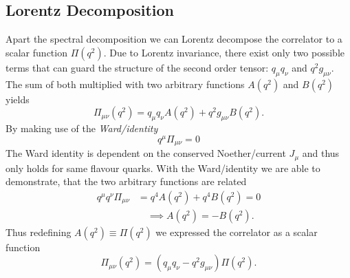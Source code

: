\documentclass[../../index.tex]{subfiles}
\begin{document}
\subsection{Lorentz Decomposition}
Apart the spectral decomposition we can Lorentz decompose the correlator to a
scalar function $\Pi(q^2)$. Due to Lorentz invariance, there exist only two
possible terms that can guard the structure of the second order tensor: $q_\mu
q_\nu$ and $q^2 g_{\mu\nu}$. The sum of both multiplied with two arbitrary
functions $A(q^2)$ and $B(q^2)$ yields
\begin{equation}
  \Pi_{\mu\nu}(q^2) = q_\mu q_\nu A(q^2) + q^2 g_{\mu\nu} B(q^2).
\end{equation}
By making use of the \textit{Ward\-/identity}
\begin{equation}
  \label{eq:wardIdentity}
  q^\mu \Pi_{\mu\nu} = 0
\end{equation} 
The Ward identity is dependent on the conserved Noether\-/current $J_\mu$ and
thus only holds for same flavour quarks. With the Ward\-/identity we are able to
demonstrate, that the two arbitrary functions are related
\begin{equation}
  \begin{split}
    q^\mu q^\nu \Pi_{\mu\nu} &= q^4 A(q^2) + q^4 B(q^2) = 0 \\
    &\quad \implies A(q^2) = -B(q^2).
  \end{split}
\end{equation}
Thus redefining $A(q^2) \equiv \Pi(q^2)$ we expressed the correlator as a scalar
function
\begin{equation}
  \Pi_{\mu\nu}(q^2) = (q_\mu q_\nu - q^2 g_{\mu\nu})\Pi(q^2).
\end{equation}
\end{document}

